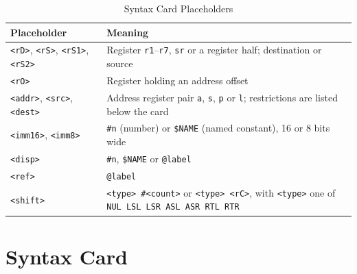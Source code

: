 \begin{table}[H]
	\centering
	\small
	\setlength{\tabcolsep}{4pt}
	\begin{tabularx}{\textwidth}{lX}
		\toprule
		\textbf{Placeholder}                                         & \textbf{Meaning}                                                                                                    \\
		\midrule
		\texttt{<rD>}, \texttt{<rS>}, \texttt{<rS1>}, \texttt{<rS2>} & Register \texttt{r1}--\texttt{r7}, \texttt{sr} or a register half; destination or source                            \\
		\texttt{<rO>}                                                & Register holding an address offset                                                                                  \\
		\texttt{<addr>}, \texttt{<src>}, \texttt{<dest>}             & Address register pair \texttt{a}, \texttt{s}, \texttt{p} or \texttt{l}; restrictions are listed below the card      \\
		\texttt{<imm16>}, \texttt{<imm8>}                            & \texttt{\#n} (number) or \texttt{\$NAME} (named constant), 16 or 8 bits wide                                        \\
		\texttt{<disp>}                                              & \texttt{\#n}, \texttt{\$NAME} or \texttt{@label}                                                                    \\
		\texttt{<ref>}                                               & \texttt{@label}                                                                                                     \\
		\texttt{<shift>}                                             & \texttt{<type> \#<count>} or \texttt{<type> <rC>}, with \texttt{<type>} one of \texttt{NUL LSL LSR ASL ASR RTL RTR} \\
		\bottomrule
	\end{tabularx}
	\caption{Syntax Card Placeholders}
	\label{tab:syntax-card-placeholders}
\end{table}

\section{Syntax Card}

